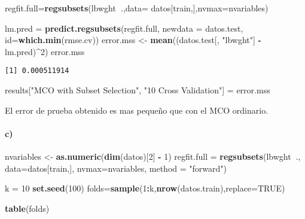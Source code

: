 \documentclass[]{article}
\newenvironment{Shaded}{\begin{snugshade}}{\end{snugshade}}
\newcommand{\KeywordTok}[1]{\textcolor[rgb]{0.13,0.29,0.53}{\textbf{#1}}}
\newcommand{\DataTypeTok}[1]{\textcolor[rgb]{0.13,0.29,0.53}{#1}}
\newcommand{\DecValTok}[1]{\textcolor[rgb]{0.00,0.00,0.81}{#1}}
\newcommand{\StringTok}[1]{\textcolor[rgb]{0.31,0.60,0.02}{#1}}
\newcommand{\OtherTok}[1]{\textcolor[rgb]{0.56,0.35,0.01}{#1}}
\newcommand{\OperatorTok}[1]{\textcolor[rgb]{0.81,0.36,0.00}{\textbf{#1}}}
\newcommand{\NormalTok}[1]{#1}
\let\oldparagraph\paragraph
\renewcommand{\paragraph}[1]{\oldparagraph{#1}\mbox{}}
\begin{document}
\begin{Shaded}
\begin{Highlighting}[]
\NormalTok{regfit.full=}\KeywordTok{regsubsets}\NormalTok{(lbwght}\OperatorTok{~}\NormalTok{.,}\DataTypeTok{data=}\NormalTok{ datos[train,],}\DataTypeTok{nvmax=}\NormalTok{nvariables)}

\NormalTok{lm.pred =}\StringTok{ }\KeywordTok{predict.regsubsets}\NormalTok{(regfit.full, }\DataTypeTok{newdata =}\NormalTok{ datos.test, }\DataTypeTok{id=}\KeywordTok{which.min}\NormalTok{(rmse.cv))}
\NormalTok{error.mss <-}\StringTok{ }\KeywordTok{mean}\NormalTok{((datos.test[, }\StringTok{"lbwght"}\NormalTok{] }\OperatorTok{-}\StringTok{ }\NormalTok{lm.pred)}\OperatorTok{^}\DecValTok{2}\NormalTok{)}
\NormalTok{error.mss }
\end{Highlighting}
\end{Shaded}

\begin{verbatim}
[1] 0.000511914
\end{verbatim}

\begin{Shaded}
\begin{Highlighting}[]
\NormalTok{results[}\StringTok{"MCO with Subset Selection"}\NormalTok{, }\StringTok{"10 Cross Validation"}\NormalTok{] =}\StringTok{ }\NormalTok{error.mss}
\end{Highlighting}
\end{Shaded}

El error de prueba obtenido es mas pequeño que con el MCO ordinario.

\paragraph{c)}\label{c}

\begin{Shaded}
\begin{Highlighting}[]
\NormalTok{nvariables <-}\StringTok{ }\KeywordTok{as.numeric}\NormalTok{(}\KeywordTok{dim}\NormalTok{(datos)[}\DecValTok{2}\NormalTok{] }\OperatorTok{-}\StringTok{ }\DecValTok{1}\NormalTok{)}
\NormalTok{regfit.full =}\StringTok{ }\KeywordTok{regsubsets}\NormalTok{(lbwght}\OperatorTok{~}\NormalTok{., }\DataTypeTok{data=}\NormalTok{datos[train,], }\DataTypeTok{nvmax=}\NormalTok{nvariables, }\DataTypeTok{method =} \StringTok{"forward"}\NormalTok{)}

\NormalTok{k =}\StringTok{ }\DecValTok{10}
\KeywordTok{set.seed}\NormalTok{(}\DecValTok{100}\NormalTok{)}
\NormalTok{folds=}\KeywordTok{sample}\NormalTok{(}\DecValTok{1}\OperatorTok{:}\NormalTok{k,}\KeywordTok{nrow}\NormalTok{(datos.train),}\DataTypeTok{replace=}\OtherTok{TRUE}\NormalTok{)}

\KeywordTok{table}\NormalTok{(folds)}
\end{Highlighting}
\end{Shaded}
\end{document}
